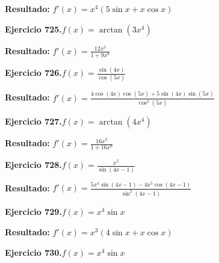 \documentclass[10pt,a4paper]{article}
\begin{document}
\begin{solbox}
\textbf{Resultado:} \(\displaystyle f'(x) = x^{4}(5\sin x + x\cos x)\)
\end{solbox}

\begin{ejbox}
\textbf{Ejercicio 725.}\quad $f(x) = \arctan(3x^{4})$
\end{ejbox}

\begin{solbox}
\textbf{Resultado:} \(\displaystyle f'(x) = \frac{12x^{3}}{1+9x^{8}}\)
\end{solbox}

\begin{ejbox}
\textbf{Ejercicio 726.}\quad $f(x) = \frac{\sin(4x)}{\cos(5x)}$
\end{ejbox}

\begin{solbox}
\textbf{Resultado:} \(\displaystyle f'(x) = \frac{4\cos(4x)\cos(5x) + 5\sin(4x)\sin(5x)}{\cos^2(5x)}\)
\end{solbox}

\newpage
\begin{ejbox}
\textbf{Ejercicio 727.}\quad $f(x) = \arctan(4x^{4})$
\end{ejbox}

\begin{solbox}
\textbf{Resultado:} \(\displaystyle f'(x) = \frac{16x^{3}}{1+16x^{8}}\)
\end{solbox}

\begin{ejbox}
\textbf{Ejercicio 728.}\quad $f(x) = \frac{x^{5}}{\sin(4x -1)}$
\end{ejbox}

\begin{solbox}
\textbf{Resultado:} \(\displaystyle f'(x) = \frac{5x^{4}\sin(4x -1) - 4x^{5}\cos(4x -1)}{\sin^2(4x -1)}\)
\end{solbox}

\begin{ejbox}
\textbf{Ejercicio 729.}\quad $f(x) = x^{4} \sin x$
\end{ejbox}

\begin{solbox}
\textbf{Resultado:} \(\displaystyle f'(x) = x^{3}(4\sin x + x\cos x)\)
\end{solbox}

\newpage
\begin{ejbox}
\textbf{Ejercicio 730.}\quad $f(x) = x^{4} \sin x$
\end{ejbox}
\end{document}
